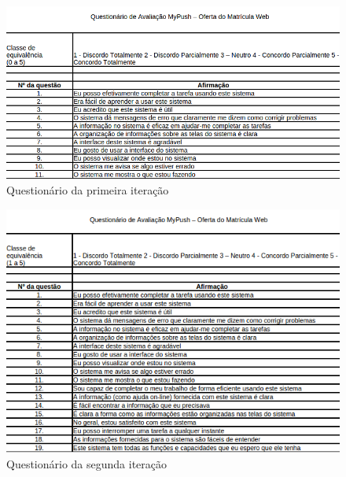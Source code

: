   \begin{figure}[h!]
  \centering
    \includegraphics[keepaspectratio=true, scale=0.6]{figuras/questionario1.png}
  \caption{Questionário da primeira iteração}
\end{figure}

  \begin{figure}[h!]
  \centering
    \includegraphics[keepaspectratio=true, scale=0.8]{figuras/questionario2.png}
  \caption{Questionário da segunda iteração}
\end{figure}
